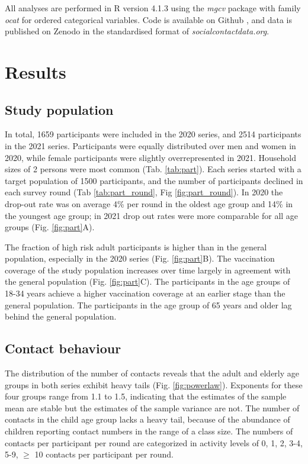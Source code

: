\documentclass[fleqn,10pt]{wlscirep}
\begin{document}
All analyses are performed in R version 4.1.3 \cite{R_2022} using the \textit{mgcv} package \cite{Wood_2017} with family \textit{ocat} for ordered categorical variables. Code is available on Github \cite{Github_RIVM}, and data is published on Zenodo \cite{Zenodo_2022} in the standardised format of \textit{socialcontactdata.org}.

\section*{Results}

\subsection*{Study population}

In total, 1659 participants were included in the 2020 series, and 2514 participants in the 2021 series. Participants were equally distributed over men and women in 2020, while female participants were slightly overrepresented in 2021. Household sizes of 2 persons were most common (Tab. \ref{tab:part}). Each series started with a target population of 1500 participants, and the number of participants declined in each survey round (Tab \ref{tab:part_round}, Fig \ref{fig:part_round}). In 2020 the drop-out rate was on average 4\% per round in the oldest age group and 14\% in the youngest age group; in 2021 drop out rates were more comparable for all age groups (Fig. \ref{fig:part}A).

The fraction of high risk adult participants is higher than in the general population, especially in the 2020 series (Fig. \ref{fig:part}B). The vaccination coverage of the study population increases over time largely in agreement with the general population (Fig. \ref{fig:part}C). The participants in the age groups of 18-34 years achieve a higher vaccination coverage at an earlier stage than the general population. The participants in the age group of 65 years and older lag behind the general population.


\subsection*{Contact behaviour}

The distribution of the number of contacts reveals that the adult and elderly age groups in both series exhibit heavy tails (Fig. \ref{fig:powerlaw}). Exponents for these four groups range from 1.1 to 1.5, indicating that the estimates of the sample mean are stable but the estimates of the sample variance are not. The number of contacts in the child age group lacks a heavy tail, because of the abundance of children reporting contact numbers in the range of a class size. The numbers of contacts per participant per round are categorized in activity levels of 0, 1, 2, 3-4, 5-9, $\geq$ 10 contacts per participant per round.
\end{document}
